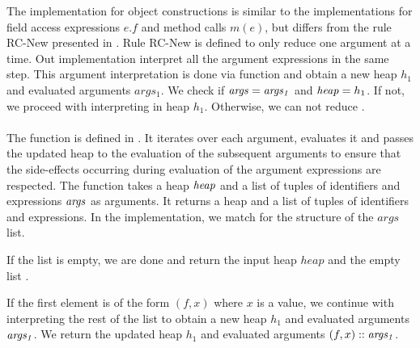 %
The implementation for object constructions 
is similar to the implementations for field access expressions $e.f$
and method calls $m(e)$,
but differs from the rule RC-New presented in .
Rule RC-New is defined to only reduce one argument at a time.
Out implementation interpret all the argument expressions in the same step.
This argument interpretation is done via function 
and obtain a new heap $h_1$ and evaluated arguments $args_1$.
We check if $\mathit{args} = \mathit{args_1}$ and $\mathit{heap} = h_1$.
If not, we proceed with interpreting  in heap $h_1$.
Otherwise, we can not reduce .\\
\\
The function  is defined in .
It iterates over each argument, evaluates it
and passes the updated heap to the evaluation of the subsequent arguments
to ensure that the side-effects occurring during evaluation
of the argument expressions are respected.
The function takes a heap $\mathit{heap}$ and a list of tuples of
identifiers and expressions $\mathit{args}$ as arguments.
It returns a heap and a list of tuples of identifiers and expressions.
In the implementation, we match for the structure of the $args$ list.

If the list is empty, we are done and return the input heap $heap$
and the empty list \nil.

If the first element is of the form $(f, x)$ where $x$ is a value,
we continue with interpreting the rest of the list
to obtain a new heap $h_1$ and evaluated arguments $\mathit{args_1}$.
We return the updated heap $h_1$ and evaluated arguments $(f, x) :: \mathit{args_1}$.

